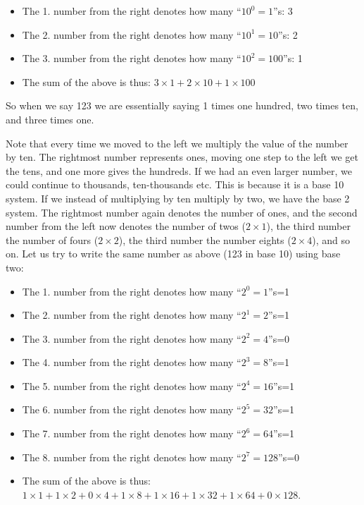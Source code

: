 \documentclass[
]{book}
\providecommand{\tightlist}{%
  \setlength{\itemsep}{0pt}\setlength{\parskip}{0pt}}
\begin{document}
\begin{itemize}
\tightlist
\item
  The 1. number from the right denotes how many ``\(10^0=1\)''s: 3
\item
  The 2. number from the right denotes how many ``\(10^1=10\)''s: 2
\item
  The 3. number from the right denotes how many ``\(10^2=100\)''s: 1
\item
  The sum of the above is thus: \(3 \times 1+2\times 10+1\times 100\)
\end{itemize}

So when we say 123 we are essentially saying 1 times one hundred, two times ten, and three times one.

Note that every time we moved to the left we multiply the value of the number by ten. The rightmost number represents ones, moving one step to the left we get the tens, and one more gives the hundreds. If we had an even larger number, we could continue to thousands, ten-thousands etc. This is because it is a base 10 system. If we instead of multiplying by ten multiply by two, we have the base 2 system. The rightmost number again denotes the number of ones, and the second number from the left now denotes the number of twos (\(2\times 1\)), the third number the number of fours (\(2\times 2\)), the third number the number eights (\(2\times 4\)), and so on. Let us try to write the same number as above (123 in base 10) using base two:

\begin{itemize}
\tightlist
\item
  The 1. number from the right denotes how many ``\(2^0=1\)''s=1
\item
  The 2. number from the right denotes how many ``\(2^1=2\)''s=1
\item
  The 3. number from the right denotes how many ``\(2^2=4\)''s=0
\item
  The 4. number from the right denotes how many ``\(2^3=8\)''s=1
\item
  The 5. number from the right denotes how many ``\(2^4=16\)''s=1
\item
  The 6. number from the right denotes how many ``\(2^5=32\)''s=1
\item
  The 7. number from the right denotes how many ``\(2^6=64\)''s=1
\item
  The 8. number from the right denotes how many ``\(2^7=128\)''s=0
\item
  The sum of the above is thus: \(1 \times 1+1\times 2+0\times 4 +1\times 8 +1\times 16 +1\times 32 +1\times 64 +0\times 128.\)
\end{itemize}
\end{document}
